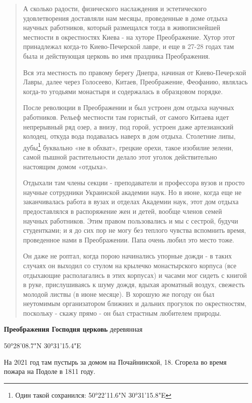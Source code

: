 \begin{quotation}
А сколько радости, физического наслаждения и эстетического удовлетворения доставляли нам месяцы, проведенные в доме отдыха научных работников, который размещался тогда в живописнейшей местности в окрестностях Киева - на хуторе Преображение. Хутор этот принадлежал когда-то Киево-Печерской лавре, и еще в 27-28 годах там была и действующая церковь во имя праздника Преображения.

Вся эта местность по правому берегу Днепра, начиная от Киево-Печер­cкой Лавры, далее через Голосеево, Китаев, Преображение, Феофанию, являлась когда-то угодьями монастыря и содержалась в образцо­вом порядке. 

После революции в Преображении и был устроен дом отдыха научных работников. Рельеф местности там гористый, от са­мого Китаева идет непрерывный ряд озер, а внизу, под горой, устроен даже артезианский колодец, откуда вода подавалась наверх в дом отдыха. Столетние липы, дубы\footnote{Один такой сохранился: 50°22'11.6"N 30°31'15.8"E} буквально «не в обхват», грецкие орехи, такое изобилие зелени, самой пышной растительности делало этот уголок действительно настоящим домом «отдыха».

Отдыхали там члены секции - преподаватели и профессора вузов и просто научные сотрудники Украинской академии наук. Но в июне, когда еще не заканчивалась работа в вузах и отделах Академии наук, этот дом отдыха предоставлял­ся в распоряжение жен и детей, вообще членов семей научных работников. Этим правом пользовались и мы с сестрой, будучи студентками; и я до сих пор не могу без теплого чувства вспомнить время, проведен­ное нами в Преображении. Папа очень любил это место тоже. 

Он даже не роптал, когда порою начинались упорные дожди - в таких случаях он выходил со стулом на крылечко монастырского корпуса (все отды­хающие располагались в этих корпусах) и часами мог сидеть с книгой в руке, прислушиваясь к шуму дождя, вдыхая ароматный воздух, свежесть молодой листвы (в июне месяце). В хорошую же погоду он был
неутомимым организатором ближних и дальних прогулок по окрестно­стям, поскольку - скажу прямо - он был страстным любителем при­роды.
\end{quotation}

 

\textbf{Преображения Господня церковь} деревянная

50°28'08.7"N 30°31'15.4"E

На 2021 год там пустырь за домом на Почайнинской, 18. Сгорела во время пожара на Подоле в 1811 году.\\ 

